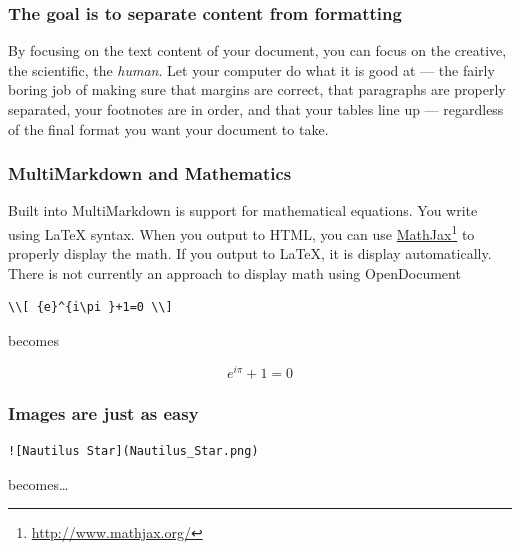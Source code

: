 \begin{frame}

\frametitle{The goal is to separate content from formatting}
\label{thegoalistoseparatecontentfromformatting}

By focusing on the text content of your document, you can focus on the
creative, the scientific, the \emph{human}. Let your computer do what it is good at
--- the fairly boring job of making sure that margins are correct, that
paragraphs are properly separated, your footnotes are in order, and that your
tables line up --- regardless of the final format you want your document to
take.

\end{frame}

\begin{frame}[fragile]

\frametitle{MultiMarkdown and Mathematics}
\label{multimarkdownandmathematics}

Built into MultiMarkdown is support for mathematical equations. You write
using LaTeX syntax. When you output to HTML, you can use
\href{http://www.mathjax.org/}{MathJax}\footnote{\href{http://www.mathjax.org/}{http:/\slash www.mathjax.org\slash }} to properly display the math. If you output
to LaTeX, it is display automatically. There is not currently an approach to
display math using OpenDocument

\begin{verbatim}
\\[ {e}^{i\pi }+1=0 \\]
\end{verbatim}


becomes

\[ {e}^{i\pi }+1=0 \]

\end{frame}

\begin{frame}[fragile]

\frametitle{Images are just as easy}
\label{imagesarejustaseasy}

\begin{verbatim}
![Nautilus Star](Nautilus_Star.png)
\end{verbatim}


becomes{\ldots}

\end{frame}

